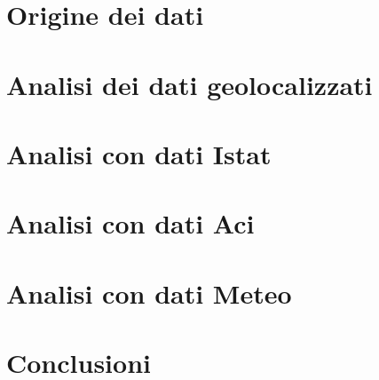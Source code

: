 \documentclass[a4paper,12pt]{article}
\begin{document}
\section{Origine dei dati}
\section{Analisi dei dati geolocalizzati}
\section{Analisi con dati Istat}
\section{Analisi con dati Aci}
\section{Analisi con dati Meteo}
\section{Conclusioni}
\end{document}
